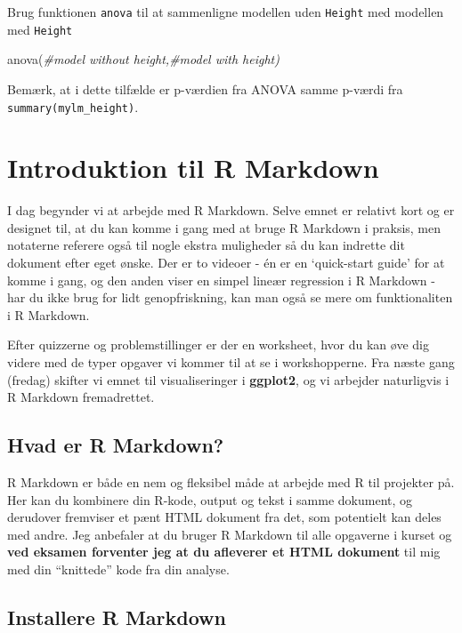 \documentclass[
]{book}
\newenvironment{Shaded}{\begin{snugshade}}{\end{snugshade}}
\newcommand{\CommentTok}[1]{\textcolor[rgb]{0.56,0.35,0.01}{\textit{#1}}}
\newcommand{\FunctionTok}[1]{\textcolor[rgb]{0.00,0.00,0.00}{#1}}
\newcommand{\NormalTok}[1]{#1}
\begin{document}
Brug funktionen \texttt{anova} til at sammenligne modellen uden \texttt{Height} med modellen med \texttt{Height}

\begin{Shaded}
\begin{Highlighting}[]
\FunctionTok{anova}\NormalTok{(}\CommentTok{\#model without height,\#model with height)}
\end{Highlighting}
\end{Shaded}

Bemærk, at i dette tilfælde er p-værdien fra ANOVA samme p-værdi fra \texttt{summary(mylm\_height)}.

\hypertarget{rmarkdown}{%
\chapter{Introduktion til R Markdown}\label{rmarkdown}}

I dag begynder vi at arbejde med R Markdown. Selve emnet er relativt kort og er designet til, at du kan komme i gang med at bruge R Markdown i praksis, men notaterne referere også til nogle ekstra muligheder så du kan indrette dit dokument efter eget ønske. Der er to videoer - én er en `quick-start guide' for at komme i gang, og den anden viser en simpel lineær regression i R Markdown - har du ikke brug for lidt genopfriskning, kan man også se mere om funktionaliten i R Markdown.

Efter quizzerne og problemstillinger er der en worksheet, hvor du kan øve dig videre med de typer opgaver vi kommer til at se i workshopperne. Fra næste gang (fredag) skifter vi emnet til visualiseringer i \textbf{ggplot2}, og vi arbejder naturligvis i R Markdown fremadrettet.

\hypertarget{hvad-er-r-markdown}{%
\section{Hvad er R Markdown?}\label{hvad-er-r-markdown}}

R Markdown er både en nem og fleksibel måde at arbejde med R til projekter på. Her kan du kombinere din R-kode, output og tekst i samme dokument, og derudover fremviser et pænt HTML dokument fra det, som potentielt kan deles med andre. Jeg anbefaler at du bruger R Markdown til alle opgaverne i kurset og \textbf{ved eksamen forventer jeg at du afleverer et HTML dokument} til mig med din ``knittede'' kode fra din analyse.

\hypertarget{installere-r-markdown}{%
\section{Installere R Markdown}\label{installere-r-markdown}}
\end{document}

